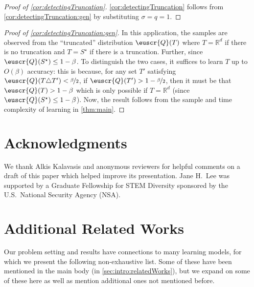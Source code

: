 \documentclass[11pt]{article}
\theoremstyle{plain}
\theoremstyle{definition}
\theoremstyle{remark}
\newcommand{\R}{\mathbb{R}}
\newcommand{\nfrac}[2]{\nicefrac{#1}{#2}}
\newcommand{\customcal}[1]{\euscr{#1}}
\newcommand{\cQ}{\customcal{Q}}
\begin{document}
    
    
    \begin{proof}[Proof of \cref{cor:detectingTruncation}]
        \cref{cor:detectingTruncation} follows from \cref{cor:detectingTruncation:gen} by substituting $\sigma=q=1$.
    \end{proof}
    \begin{proof}[Proof of \cref{cor:detectingTruncation:gen}]
        In this application, the samples are observed from the ``truncated'' distribution $\cQ(T)$ where $T=\R^d$ if there is no truncation and $T=S^\star$ if there is a truncation.
        Further, since $\cQ(S^\star)\leq 1-\beta$.
        To distinguish the two cases, it suffices to learn $T$ up to $O(\beta)$ accuracy:
        this is because, for any set $T'$ satisfying $\cQ(T\triangle T') < \nfrac{\beta}{2}$, if $\cQ(T') > 1-\nfrac{\beta}{2}$, then it must be that $\cQ(T) > 1-\beta$ which is only possible if $T=\R^d$ (since $\cQ(S^\star)\leq 1-\beta$).
        Now, the result follows from the sample and time complexity of learning in \cref{thm:main}.
    \end{proof}

\ifanon
\else 
\section*{Acknowledgments}
    We thank Alkis Kalavasis and anonymous reviewers for helpful comments on a draft of this paper which helped improve its presentation.
    Jane H.\ Lee was supported by a Graduate Fellowship for STEM Diversity sponsored by the U.S.\ National Security Agency (NSA). 
\fi 




\newpage
\printbibliography
\newpage

\appendix 
{}

\section{Additional Related Works}\label{sec:appendix:related}
        

        
       Our problem setting and results have connections to many learning models, for which we present the following non-exhaustive list. Some of these have been mentioned in the main body (in \cref{sec:intro:relatedWorks}), but we expand on some of these here as well as mention additional ones not mentioned before.
\end{document}
